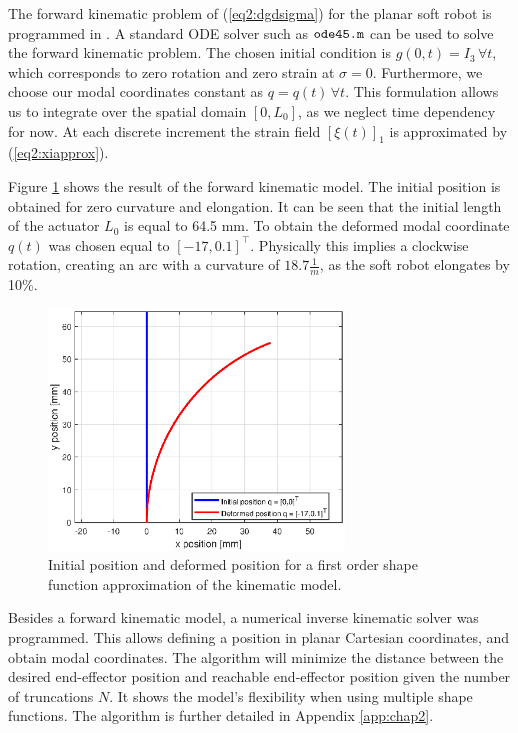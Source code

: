 The forward kinematic problem of (\ref{eq2:dgdsigma}) for the planar soft robot is programmed in \MATLAB \cite{MATLAB2020}. A standard ODE solver such as $\verb+ode45.m+$ can be used to solve the forward kinematic problem. The chosen initial condition is $g(0,t) = I_3 \hspace{2pt} \forall t$, which corresponds to zero rotation and zero strain at $\sigma = 0$. Furthermore, we choose our modal coordinates constant as $q = q(t) \hspace{2pt} \forall t$. This formulation allows us to integrate over the spatial domain $[0,L_0]$, as we neglect time dependency for now. At each discrete increment the strain field $[\xi(t)]_1$ is approximated by (\ref{eq2:xiapprox}). 

Figure \ref{fig1:forward_kinematic} shows the result of the forward kinematic model. The initial position is obtained for zero curvature and elongation. It can be seen that the initial length of the actuator $L_0$ is equal to 64.5 mm. To obtain the deformed modal coordinate $q(t)$ was chosen equal to $[-17,0.1]^\top$. Physically this implies a clockwise rotation, creating an arc with a curvature of $18.7 \frac{1}{m}$, as the soft robot elongates by 10\%.


\begin{figure}[H]
    \centering
    \includegraphics[width = 0.7\textwidth]{Figures/Chapter2/fkin1701.eps}
    \caption{Initial position and deformed position for a first order shape function approximation of the kinematic model.}
    \label{fig1:forward_kinematic}
\end{figure}

Besides a forward kinematic model, a numerical inverse kinematic solver was programmed. This allows defining a position in planar Cartesian coordinates, and obtain modal coordinates. The algorithm will minimize the distance between the desired end-effector position and reachable end-effector position given the number of truncations $N$. It shows the model's flexibility when using multiple shape functions. The algorithm is further detailed in Appendix \ref{app:chap2}. 

